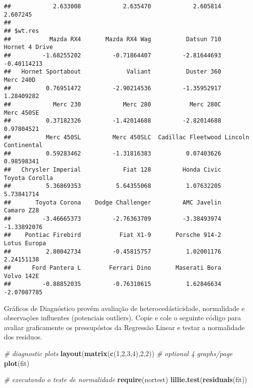 \documentclass[]{article}
\newenvironment{Shaded}{\begin{snugshade}}{\end{snugshade}}
\newcommand{\CommentTok}[1]{\textcolor[rgb]{0.56,0.35,0.01}{\textit{#1}}}
\newcommand{\DecValTok}[1]{\textcolor[rgb]{0.00,0.00,0.81}{#1}}
\newcommand{\KeywordTok}[1]{\textcolor[rgb]{0.13,0.29,0.53}{\textbf{#1}}}
\newcommand{\NormalTok}[1]{#1}
\begin{document}
\begin{verbatim}
##            2.633008            2.635470            2.605814            2.607245 
## 
## $wt.res
##           Mazda RX4       Mazda RX4 Wag          Datsun 710      Hornet 4 Drive 
##         -1.68255202         -0.71864407         -2.81644693         -0.40114213 
##   Hornet Sportabout             Valiant          Duster 360           Merc 240D 
##          0.76951472         -2.90214536         -1.35952917          1.28409282 
##            Merc 230            Merc 280           Merc 280C          Merc 450SE 
##          0.37182326         -1.42014688         -2.82014688          0.97804521 
##          Merc 450SL         Merc 450SLC  Cadillac Fleetwood Lincoln Continental 
##          0.59283462         -1.31816383          0.07403626          0.98598341 
##   Chrysler Imperial            Fiat 128         Honda Civic      Toyota Corolla 
##          5.36869353          5.64355068          1.07632205          5.73841714 
##       Toyota Corona    Dodge Challenger         AMC Javelin          Camaro Z28 
##         -3.46665373         -2.76363709         -3.38493974         -1.33892076 
##    Pontiac Firebird           Fiat X1-9       Porsche 914-2        Lotus Europa 
##          2.80042734         -0.45815757          1.02001176          2.24151138 
##      Ford Pantera L        Ferrari Dino       Maserati Bora          Volvo 142E 
##         -0.88852035         -0.76310615          1.62846634         -2.07087785
\end{verbatim}

Gráficos de Diagnóstico provém avaliação de heterocedásticidade,
normalidade e observações influentes (potenciais outliers). Copie e cole
o seguinte código para avaliar graficamente os pressupóstos da Regressão
Linear e testar a normalidade dos residuos.

\begin{Shaded}
\begin{Highlighting}[]
\CommentTok{# diagnostic plots }
\KeywordTok{layout}\NormalTok{(}\KeywordTok{matrix}\NormalTok{(}\KeywordTok{c}\NormalTok{(}\DecValTok{1}\NormalTok{,}\DecValTok{2}\NormalTok{,}\DecValTok{3}\NormalTok{,}\DecValTok{4}\NormalTok{),}\DecValTok{2}\NormalTok{,}\DecValTok{2}\NormalTok{)) }\CommentTok{# optional 4 graphs/page }
\KeywordTok{plot}\NormalTok{(fit)}

\CommentTok{# executando o teste de normalidade}
\KeywordTok{require}\NormalTok{(nortest)}
\KeywordTok{lillie.test}\NormalTok{(}\KeywordTok{residuals}\NormalTok{(fit))}
\end{Highlighting}
\end{Shaded}
\end{document}
